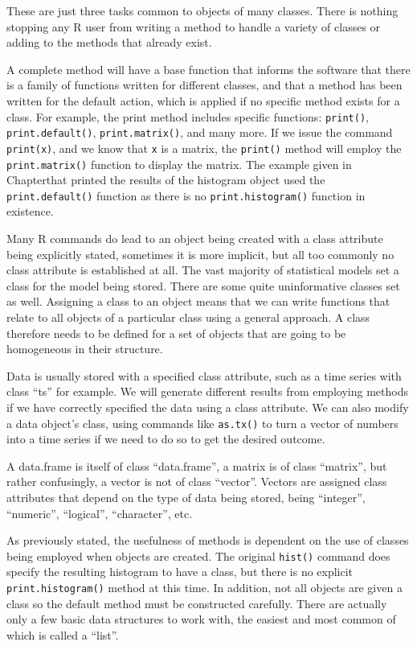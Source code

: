 \documentclass[
]{book}
\begin{document}
These are just three tasks common to objects of many classes. There is nothing stopping any R user from writing a method to handle a variety of classes or adding to the methods that already exist.

A complete method will have a base function that informs the software that there is a family of functions written for different classes, and that a method has been written for the default action, which is applied if no specific method exists for a class. For example, the print method includes specific functions: \texttt{print()}, \texttt{print.default()}, \texttt{print.matrix()}, and many more.
If we issue the command \texttt{print(x)}, and we know that \texttt{x} is a matrix, the \texttt{print()} method will employ the \texttt{print.matrix()} function to display the matrix. The example given in Chapterthat printed the results of the histogram object used the \texttt{print.default()} function as there is no \texttt{print.histogram()} function in existence.

Many R commands do lead to an object being created with a class attribute being explicitly stated, sometimes it is more implicit, but all too commonly no class attribute is established at all. The vast majority of statistical models set a class for the model being stored. There are some quite uninformative classes set as well.
Assigning a class to an object means that we can write functions that relate to all objects of a particular class using a general approach. A class therefore needs to be defined for a set of objects that are going to be homogeneous in their structure.

Data is usually stored with a specified class attribute, such as a time series with class ``ts'' for example. We will generate different results from employing methods if we have correctly specified the data using a class attribute. We can also modify a data object's class, using commands like \texttt{as.tx()} to turn a vector of numbers into a time series if we need to do so to get the desired outcome.

A data.frame is itself of class ``data.frame'', a matrix is of class ``matrix'', but rather confusingly, a vector is not of class ``vector''. Vectors are assigned class attributes that depend on the type of data being stored, being ``integer'', ``numeric'', ``logical'', ``character'', etc.

As previously stated, the usefulness of methods is dependent on the use of classes being employed when objects are created.
The original \texttt{hist()} command does specify the resulting histogram to have a class, but there is no explicit \texttt{print.histogram()} method at this time.
In addition, not all objects are given a class so the default method must be constructed carefully.
There are actually only a few basic data structures to work with, the easiest and most common of which is called a ``list''.
\end{document}
